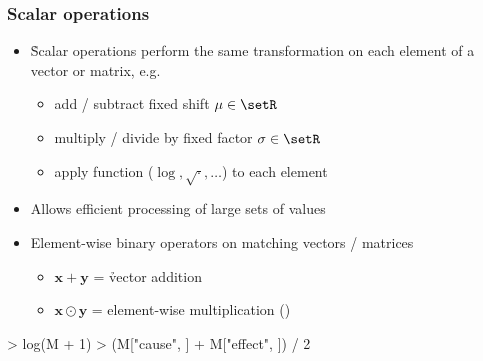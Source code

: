 \documentclass[t]{beamer} %
\begin{document}
\begin{frame}[fragile]
  \frametitle{Scalar operations}
  
  \begin{itemize}
  \item \h{Scalar} operations perform the same transformation on each element of a vector or matrix, e.g.\
    \begin{itemize}
    \item add / subtract fixed shift $\mu\in \setR$
    \item multiply / divide by fixed factor $\sigma\in \setR$
    \item apply function ($\log, \sqrt{\cdot}, \ldots$) to each element
    \end{itemize}
  \item Allows efficient processing of large sets of values
  \item<2-> Element-wise binary operators on matching vectors / matrices
    \begin{itemize}
    \item $\mathbf{x} + \mathbf{y}$ = \h{vector addition}
    \item $\mathbf{x} \odot \mathbf{y}$ = element-wise multiplication ()
    \end{itemize}
  \end{itemize}
  
\begin{Rcode}
> log(M + 1) 
> (M["cause", ] + M["effect", ]) / 2 
\end{Rcode}
\end{frame}
\end{document}
